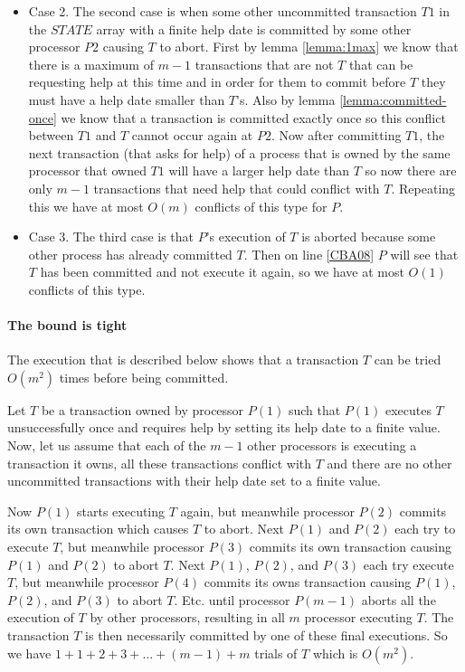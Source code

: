 \begin{proofT}
\begin{itemize}
\item
Case  2. The second case  is when  some  other uncommitted transaction
$T1$ in  the $\mathit{STATE}$  array with a  finite help  date is committed
by some other processor $P2$ causing $T$ to abort.
First by  lemma \ref{lemma:1max} we know  that there is a  maximum of $m-1$
transactions that are not $T$ that  can be requesting help at this time and
in order for them  to commit before $T$ they must have  a help date smaller
than $T$'s.
Also  by lemma  \ref{lemma:committed-once} we  know that  a  transaction is
committed exactly once  so this conflict between $T1$  and $T$ cannot occur
again at $P2$.
Now after committing  $T1$, the next transaction (that asks  for help) of a
process that  is owned by  the same processor  that owned $T1$ will  have a
larger help  date than $T$  so now there  are only $m-1$  transactions that
need help that could conflict with $T$.
Repeating this we have at most $O(m)$ conflicts of this type for $P$.
\item
Case  3. The  third case is  that $P$'s  execution of $T$  is aborted
because some other process has already committed $T$.
Then on  line \ref{CBA08} $P$ will see  that $T$ has been  committed and not
execute it again, so we have at most $O(1)$ conflicts of this type.
\end{itemize}
\renewcommand{\toto}{proof:try-bounds}
\end{proofT}




\paragraph{The bound is tight}
The  execution that is described below shows that a  transaction $T$ 
can be tried  $O(m^2)$ times before being committed. 

Let  $T$ be a transaction owned by processor $P(1)$ such that 
$P(1)$ executes $T$ unsuccessfully once and requires help 
by setting its help date to a finite value. 
Now, let us assume that each of the  $m-1$ other processors  is 
executing a transaction it owns,  all  these  transactions
conflict with  $T$ and  there are no  other uncommitted  transactions with
their help date set to a finite value.
 
Now $P(1)$ starts executing $T$  again, but meanwhile processor $P(2)$ 
commits its own transaction which causes $T$ to abort. 
Next $P(1)$  and $P(2)$  each try to execute $T$, but meanwhile processor $P(3)$  
commits its own transaction causing $P(1)$ and $P(2)$ to abort $T$. 
Next $P(1)$, $P(2)$, and $P(3)$ each try execute $T$, but meanwhile processor 
$P(4)$ commits its owns transaction causing $P(1)$, $P(2)$, and $P(3)$ 
to abort  $T$. Etc.  until  processor  $P(m-1)$  aborts all  the  
execution of $T$ by  other processors, resulting in all $m$ processor 
executing $T$. The transaction $T$ is then  necessarily committed by one of 
these final executions. 
So we have $1+1+2+3+\ldots+(m-1)+m$ trials of $T$ which is  $O(m^2)$.

